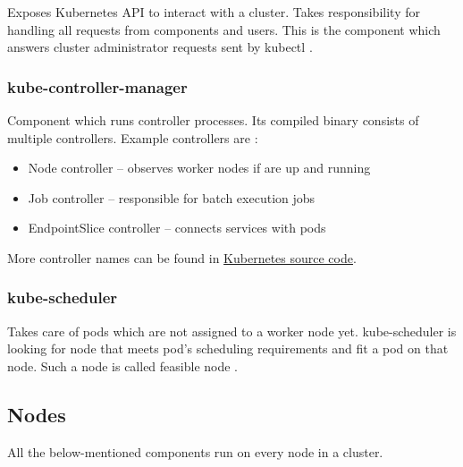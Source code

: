 Exposes Kubernetes API to interact with a cluster. Takes responsibility for handling all requests from components and users. This is the component which answers cluster administrator requests sent by kubectl \cite{KubernetesArch}.


\subsubsection{kube-controller-manager}
\label{sec:kubeControllerManager}

Component which runs controller processes. Its compiled binary consists of multiple controllers. Example controllers are \cite{KubernetesArch}:

\begin{itemize}
    \item Node controller -- observes worker nodes if are up and running
    \item Job controller -- responsible for batch execution jobs
    \item EndpointSlice controller -- connects services with pods
\end{itemize}

More controller names can be found in \href{https://github.com/kubernetes/kubernetes/blob/master/cmd/kube-controller-manager/names/controller_names.go}{Kubernetes source code}.


\subsubsection{kube-scheduler}
\label{sec:kubeScheduler}

Takes care of pods which are not assigned to a worker node yet. kube-scheduler is looking for node that meets pod's scheduling requirements and fit a pod on that node. Such a node is called feasible node \cite{KubernetesScheduler}.


\subsection{Nodes}
\label{sec:k8sNodes}
All the below-mentioned components run on every node in a cluster.

